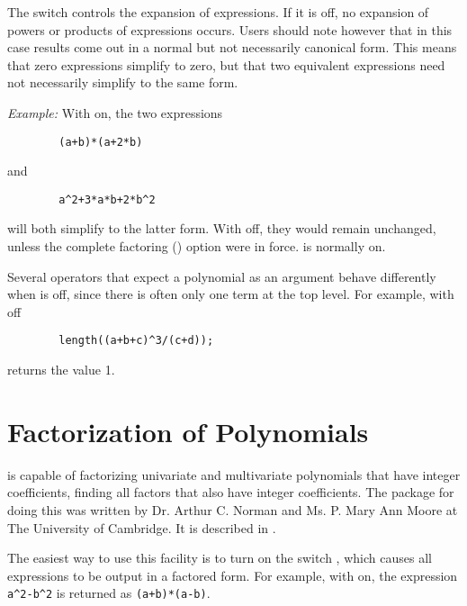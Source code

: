 The switch  controls the expansion of expressions.  If
it is off, no expansion of powers or products of expressions occurs.
Users should note however that in this case results come out in a normal
but not necessarily canonical form.  This means that zero expressions
simplify to zero, but that two equivalent expressions need not necessarily
simplify to the same form.

\textit{Example:} With  on, the two expressions
\begin{verbatim}
        (a+b)*(a+2*b)
\end{verbatim}
and
\begin{verbatim}
        a^2+3*a*b+2*b^2
\end{verbatim}
will both simplify to the latter form.  With 
off, they would remain unchanged, unless the complete factoring
() option were in force.  is normally on.

Several operators that expect a polynomial as an argument behave
differently when  is off, since there is often only one term at
the top level.  For example, with  off
\begin{verbatim}
        length((a+b+c)^3/(c+d));
\end{verbatim}
returns the value 1.

\section{Factorization of Polynomials}
\hypertarget{switch:FACTOR}{}
\hypertarget{switch:IFACTOR}{}

{\REDUCE} is capable of factorizing univariate and multivariate polynomials
that have integer coefficients, finding all factors that also have integer
coefficients. The package for doing this was written by Dr. Arthur C.
Norman and Ms. P. Mary Ann Moore at The University of Cambridge. It is
described in \cite{NormanMoore:1981A}.

The easiest way to use this facility is to turn on the switch
, which causes all expressions to be output in
a factored form.  For example, with  on, the expression
\texttt{a\textasciicircum2-b\textasciicircum2} is returned as
\texttt{(a+b)*(a-b)}.

